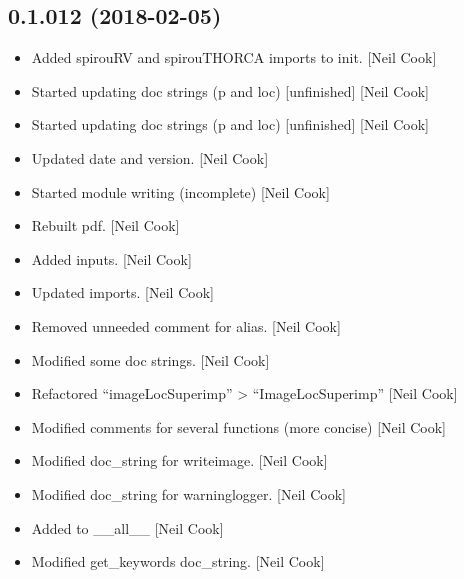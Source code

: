 \documentclass[a4paper,10pt,english]{report}
\begin{document}
\subsection{0.1.012 (2018-02-05)}
\label{\detokenize{misc/changelog:id490}}\begin{itemize}
\item {} 
Added spirouRV and spirouTHORCA imports to init. {[}Neil Cook{]}

\item {} 
Started updating doc strings (p and loc) {[}unfinished{]} {[}Neil Cook{]}

\item {} 
Started updating doc strings (p and loc) {[}unfinished{]} {[}Neil Cook{]}

\item {} 
Updated date and version. {[}Neil Cook{]}

\item {} 
Started module writing (incomplete) {[}Neil Cook{]}

\item {} 
Rebuilt pdf. {[}Neil Cook{]}

\item {} 
Added inputs. {[}Neil Cook{]}

\item {} 
Updated imports. {[}Neil Cook{]}

\item {} 
Removed unneeded comment for alias. {[}Neil Cook{]}

\item {} 
Modified some doc strings. {[}Neil Cook{]}

\item {} 
Refactored “imageLocSuperimp” \textendash{}\textgreater{} “ImageLocSuperimp” {[}Neil Cook{]}

\item {} 
Modified comments for several functions (more concise) {[}Neil Cook{]}

\item {} 
Modified doc\_string for writeimage. {[}Neil Cook{]}

\item {} 
Modified doc\_string for warninglogger. {[}Neil Cook{]}

\item {} 
Added to \_\_all\_\_ {[}Neil Cook{]}

\item {} 
Modified get\_keywords doc\_string. {[}Neil Cook{]}


\end{itemize}
\end{document}
